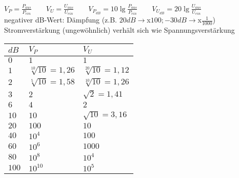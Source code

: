 $V_P=\frac{P_{aus}}{P_{ein}}\quad\quad 
    V_U=\frac{U_{aus}}{U_{ein}}\quad\quad
    V_{P_{dB}}=10\lg\frac{P_{aus}}{P_{ein}}\quad\quad
    V_{U_{dB}}=20\lg\frac{U_{aus}}{U_{ein}}$ \\
    negativer dB-Wert: Dämpfung (z.B. $20dB\rightarrow $x$100; -30dB\rightarrow $x$\frac{1}{1000}$)\\
    Stromverstärkung (ungewöhnlich) verhält sich wie Spannungsverstärkung\\

    \begin{minipage}{0.5\columnwidth}
        \renewcommand{\arraystretch}{0.9}
        \begin{table}[H]
            \centering
            \begin{tabular}{|l|l|l|}
                \hline
                $dB$  & $V_P$                 & $V_U$                  \\ \hline
                $0$   & $1$                   & $1$                    \\ \hline
                $1$   & $\sqrt[10]{10}=1,26$  & $\sqrt[20]{10}=1,12$   \\ \hline
                $2$   & $\sqrt[5]{10}=1,58$   & $\sqrt[10]{10}=1,26$   \\ \hline
                $3$   & $2$                   & $\sqrt{2}=1,41$        \\ \hline
                $6$   & $4$                   & $2$                    \\ \hline
                $10$  & $10$                  & $\sqrt{10}=3,16$       \\ \hline
                $20$  & $100$                 & $10$                   \\ \hline
                $40$  & $10^4$                & $100$                  \\ \hline
                $60$  & $10^6$                & $1000$                 \\ \hline
                $80$  & $10^8$                & $10^4$                 \\ \hline
                $100$ & $10^{10}$             & $10^5$                 \\ \hline
            \end{tabular}
        \end{table}
    \end{minipage}
